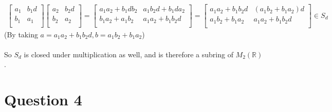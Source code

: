 \documentclass{article}
\begin{document}
\begin{align*}
\left[ {\begin{array}{cc}
   a_1 & b_1 d \\
   b_1 & a_1 \\
  \end{array} } \right]
  \left[ {\begin{array}{cc}
   a_2 & b_2 d \\
   b_2 & a_2 \\
  \end{array} } \right] = 
  \left[ {\begin{array}{cc}
   a_1 a_2 + b_1 d b_2 & a_1 b_2 d + b_1 d a_2 \\
   b_1 a_2 + a_1 b_2  & a_1 a_2 + b_1 b_2 d \\
  \end{array} } \right] = \left[ {\begin{array}{cc}
   a_1 a_2 + b_1 b_2 d & (a_1 b_2 + b_1 a_2)d \\
   a_1 b_2 + b_1 a_2 & a_1 a_2 + b_1 b_2 d \\
  \end{array} } \right] \in S_d
\end{align*}
(By taking \(a = a_1 a_2 + b_1 b_2 d, b = a_1 b_2 + b_1 a_2\))
\\\\
So \(S_d\) is closed under multiplication as well, and is therefore a subring of \(M_2(\mathds{R})\).

\section*{Question 4}
\end{document}
